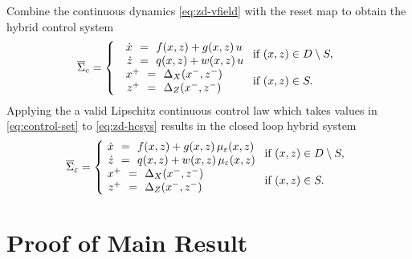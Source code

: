 \documentclass[twocolumn]{article}
\begin{document}
Combine the continuous dynamics \eqref{eq:zd-vfield} with the reset map to obtain the hybrid control system
\begin{align}
  \label{eq:zd-hcsys}
  \HCSbar= \left\{
  \begin{array}{l l}
    \begin{array}{r c l}
      {\dot \zdx} &\!\!=\!\!& f\argsxz + g\argsxz \, u\\
      {\dot \zdz} &\!\!=\!\!& q\argsxz + w\argsxz \, u
    \end{array} \!\! & \!\! \mbox{if } \argsxz \in \D \setminus \S,\\
    \begin{array}{r c l}
      \zdx^{+} &\!\!=\!\!& \DeltaX(\zdx^{-}, \zdz^{-})\\
      \zdz^{+} &\!\!=\!\!& \DeltaZ(\zdx^{-}, \zdz^{-})
    \end{array} \!\! & \!\! \mbox{if } \argsxz \in \S.
  \end{array}\right.
\end{align}
%
Applying the a valid Lipschitz continuous control law which takes values in \eqref{eq:control-set} to \eqref{eq:zd-hcsys} results in the closed loop hybrid system
%
\begin{align}
  \label{eq:zd-hsys-cl}
  \HSbar_{\resclfparam} = \left\{\!\!\!\!
  \begin{array}{l l}
    \begin{array}{r c l}
      {\dot \zdx} &\!\!=\!\!& f\argsxz + g\argsxz \, \mueps\argsxz\\
      {\dot \zdz} &\!\!=\!\!& q\argsxz + w\argsxz \, \mueps\argsxz
    \end{array} \!\! & \!\! \mbox{if } \argsxz \in \D \setminus \S,\\
    \begin{array}{r c l}
      \zdx^{+} &\!\!=\!\!& \DeltaX(\zdx^{-}, \zdz^{-})\\
      \zdz^{+} &\!\!=\!\!& \DeltaZ(\zdx^{-}, \zdz^{-})
    \end{array} \!\! & \!\! \mbox{if } \argsxz \in \S.
  \end{array}\right.
\end{align}

\section{Proof of Main Result}
\end{document}
